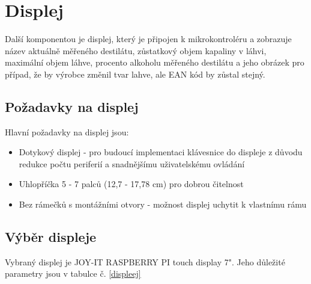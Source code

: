 






\section{Displej}
Další komponentou je displej, který je připojen k mikrokontroléru a zobrazuje název aktuálně měřeného destilátu, zůstatkový objem kapaliny v láhvi, maximální objem láhve, procento alkoholu měřeného destilátu a jeho obrázek pro případ, že by výrobce změnil tvar lahve, ale EAN kód by zůstal stejný.

\subsection{Požadavky na displej}
Hlavní požadavky na displej jsou:
\begin{itemize}
    \item Dotykový displej - pro budoucí implementaci klávesnice do displeje z důvodu redukce počtu periferií a snadnějšímu uživatelskému ovládání
    \item Uhlopříčka 5 - 7 palců (12,7 - 17,78 cm) pro dobrou čitelnost
    \item Bez rámečků s montážními otvory - možnost displej uchytit k vlastnímu rámu 
\end{itemize}

\subsection{Výběr displeje}

Vybraný displej je JOY-IT RASPBERRY PI touch display 7". Jeho důležité parametry jsou v tabulce č. \ref{displeej}\\

